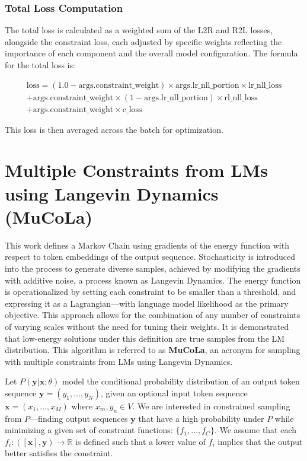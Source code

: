 \documentclass{article}
\begin{document}
\subsubsection{Total Loss Computation}

The total loss is calculated as a weighted sum of the L2R and R2L losses, alongside the constraint loss, each adjusted by specific weights reflecting the importance of each component and the overall model configuration. The formula for the total loss is:

\begin{multline*}
    \text{loss} = (1.0 - \text{args.constraint\_weight}) \times \text{args.lr\_nll\_portion} \times \text{lr\_nll\_loss} \\
    + \text{args.constraint\_weight} \times (1 - \text{args.lr\_nll\_portion}) \times \text{rl\_nll\_loss} \\
    + \text{args.constraint\_weight} \times \text{c\_loss}
\end{multline*}



This loss is then averaged across the batch for optimization.


\section{Multiple Constraints from LMs using Langevin Dynamics (MuCoLa)} \cite[]{mucola}
This work defines a Markov Chain using gradients of the energy function with respect to token embeddings of the output sequence. Stochasticity is introduced into the process to generate diverse samples, achieved by modifying the gradients with additive noise, a process known as Langevin Dynamics. The energy function is operationalized by setting each constraint to be smaller than a threshold, and expressing it as a Lagrangian—with language model likelihood as the primary objective. This approach allows for the combination of any number of constraints of varying scales without the need for tuning their weights. It is demonstrated that low-energy solutions under this definition are true samples from the LM distribution. This algorithm is referred to as \textbf{MuCoLa}, an acronym for sampling with multiple constraints from LMs using Langevin Dynamics.

Let \( P(\boldsymbol{y} | \boldsymbol{x}; \theta) \) model the conditional probability distribution of an output token sequence \( \boldsymbol{y} = (y_1, \ldots, y_N) \), given an optional input token sequence \( \boldsymbol{x} = (x_1, \ldots, x_M) \) where \( x_m, y_n \in V \). We are interested in constrained sampling from \( P \)—finding output sequences \( \boldsymbol{y} \) that have a high probability under \( P \) while minimizing a given set of constraint functions: \(\{f_1, \ldots, f_C\}\). We assume that each \( f_i : ([\boldsymbol{x}], \boldsymbol{y}) \rightarrow \mathbb{R} \) is defined such that a lower value of \( f_i \) implies that the output better satisfies the constraint.
\end{document}

